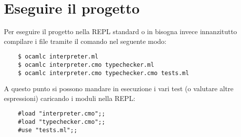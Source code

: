 \section{Eseguire il progetto}

Per eseguire il progetto nella REPL standard  o in  bisogna invece innanzitutto compilare i file  tramite il comando  nel seguente modo:
\begin{verbatim}
    $ ocamlc interpreter.ml
    $ ocamlc interpreter.cmo typechecker.ml
    $ ocamlc interpreter.cmo typechecker.cmo tests.ml
\end{verbatim} 
A questo punto si possono mandare in esecuzione i vari test (o valutare altre espressioni) caricando i moduli nella REPL:
\begin{verbatim}
    #load "interpreter.cmo";;
    #load "typechecker.cmo";;
    #use "tests.ml";;
\end{verbatim}